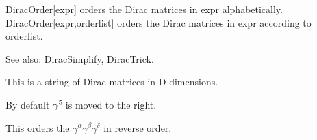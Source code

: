 DiracOrder[expr] orders the Dirac matrices in expr alphabetically. DiracOrder[expr,orderlist] orders the Dirac matrices in expr according
  to orderlist.

See also:  DiracSimplify, DiracTrick.






This is a string of Dirac matrices in D dimensions. 







By default \({{\gamma }^5}\> \)is moved to the right.









This orders the \({{\gamma }^{\alpha }}{{\gamma }^{\beta }}{{\gamma }^{\delta }}\) in reverse order.

